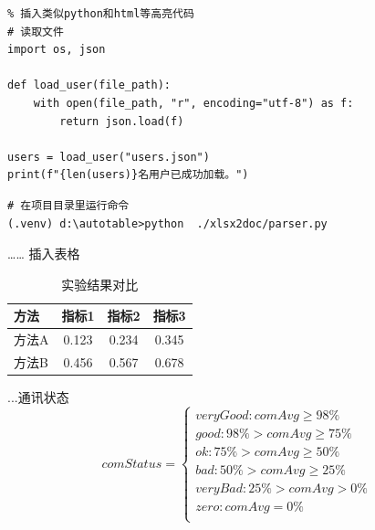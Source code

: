 \begin{verbatim}
% 插入类似python和html等高亮代码
# 读取文件
import os, json

def load_user(file_path):
    with open(file_path, "r", encoding="utf-8") as f:
        return json.load(f)

users = load_user("users.json")
print(f"{len(users)}名用户已成功加载。")
\end{verbatim}

\begin{lstlisting}
# 在项目目录里运行命令
(.venv) d:\autotable>python  ./xlsx2doc/parser.py
\end{lstlisting}


…… 插入表格
\begin{table}[ht]
    \centering
    \caption{实验结果对比}
    \begin{tabular}{lccc}
        \toprule
        方法 & 指标1 & 指标2 & 指标3 \\
        \midrule
        方法A & 0.123 & 0.234 & 0.345 \\
        方法B & 0.456 & 0.567 & 0.678 \\
        \bottomrule
    \end{tabular}
    \label{tab:results}
\end{table}

...通讯状态
\[ 
comStatus= \left\{
\begin{array}{ll}
    veryGood: comAvg \geq 98\%\\
    good: 98\% > comAvg \geq 75\%\\
    ok: 75\% > comAvg \geq 50\%\\
    bad: 50\% > comAvg \geq 25\%\\
    veryBad: 25\% > comAvg > 0\%\\
    zero: comAvg = 0\%\\
\end{array} 
\right. 
\]
